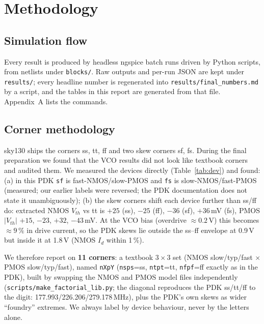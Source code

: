 \documentclass[11pt,a4paper]{article}
\newcommand{\degC}{\,$^\circ$C}
\begin{document}
\section{Methodology}
\subsection{Simulation flow}
Every result is produced by headless ngspice batch runs driven by Python scripts, from netlists under \texttt{blocks/}. Raw outputs and per-run JSON are kept under \texttt{results/}; every headline number is regenerated into \texttt{results/final\_numbers.md} by a script, and the tables in this report are generated from that file. Appendix~A lists the commands.

\subsection{Corner methodology}
sky130 ships the corners ss, tt, ff and two skew corners sf, fs. During the final preparation we found that the VCO results did not look like textbook corners and audited them. We measured the devices directly (Table~\ref{tab:dev}) and found: (a) in this PDK \texttt{sf} is fast-NMOS/slow-PMOS and \texttt{fs} is slow-NMOS/fast-PMOS (measured; our earlier labels were reversed; the PDK documentation does not state it unambiguously); (b) the skew corners shift each device further than ss/ff do: extracted NMOS $V_{th}$ vs tt is $+25$ (ss), $-25$ (ff), $-36$ (sf), $+36$\,mV (fs), PMOS $|V_{th}|$ $+15$, $-23$, $+32$, $-43$\,mV. At the VCO bias (overdrive $\approx0.2$\,V) this becomes $\approx9\,\%$ in drive current, so the PDK skews lie outside the ss--ff envelope at 0.9\,V but inside it at 1.8\,V (NMOS $I_d$ within 1\,\%).

\begin{table}[!htbp]\centering\small
\resizebox{\linewidth}{!}{}
\caption{Single-device audit at 27\degC\ (W/L = 2/0.5\,$\mu$m, ngspice~47). Skew corners fall outside the ss--ff band for the NMOS at 0.9\,V (25.3 and 51.3 vs 27.9 and 47.7\,$\mu$A). PMOS at 0.9\,V is sub-threshold.}\label{tab:dev}
\end{table}

We therefore report on \textbf{11 corners}: a textbook $3\times3$ set (NMOS slow/typ/fast $\times$ PMOS slow/typ/fast), named \texttt{nXpY} (\texttt{nsps}=ss, \texttt{ntpt}=tt, \texttt{nfpf}=ff exactly as in the PDK), built by swapping the NMOS and PMOS model files independently (\texttt{scripts/make\_factorial\_lib.py}; the diagonal reproduces the PDK ss/tt/ff to the digit: 177.993/226.206/279.178\,MHz), plus the PDK's own skews as wider ``foundry'' extremes. We always label by device behaviour, never by the letters alone.
\end{document}
